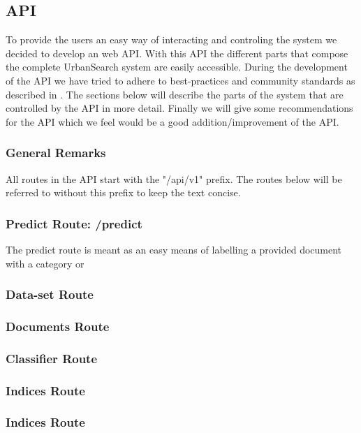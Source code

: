 \subsection{API}
To provide the users an easy way of interacting and controling the system we decided to develop an web API. With this API the different parts that compose the complete UrbanSearch system are easily accessible. During the development of the API we have tried to adhere to best-practices and community standards as described in \cite{apigee}. The sections below will describe the parts of the system that are controlled by the API in more detail. Finally we will give some recommendations for the API which we feel would be a good addition/improvement of the API.

\subsubsection{General Remarks}

All routes in the API start with the "/api/v1" prefix. The routes below will be referred to without this prefix to keep the text concise.

\subsubsection{Predict Route: /predict}
The predict route is meant as an easy means of labelling a provided document with a category or 
\subsubsection{Data-set Route}
\subsubsection{Documents Route}
\subsubsection{Classifier Route}
\subsubsection{Indices Route}
\subsubsection{Indices Route}